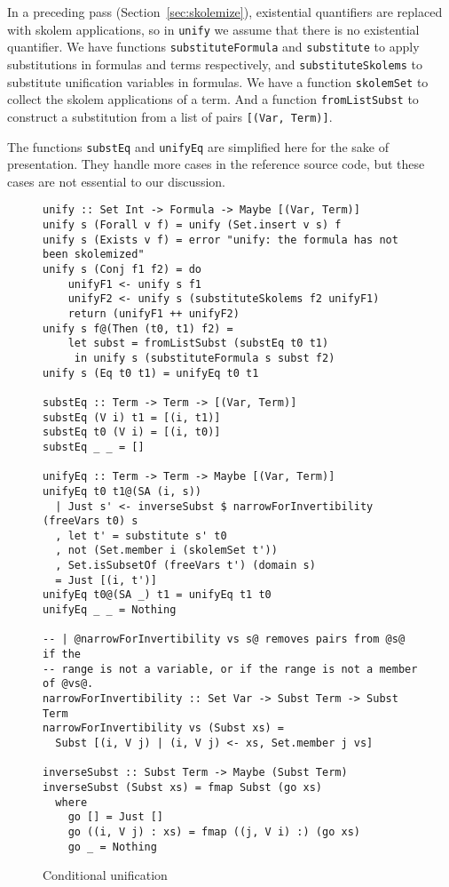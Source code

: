 \documentclass[sigconf, review]{acmart}
\newcommand{\tc}[1]{{\small\texttt{#1}}}
\begin{document}
In a preceding pass (Section~\ref{sec:skolemize}), existential quantifiers are replaced
with skolem applications, so in \tc{unify} we assume that there is no
existential quantifier. We have functions \tc{substituteFormula} and \tc{substitute}
to apply substitutions in formulas and terms respectively, and \tc{substituteSkolems} to  substitute
unification variables in formulas. We have a function \tc{skolemSet} to collect the skolem applications of a
term. And a function \tc{fromListSubst} to construct a substitution from a list of
pairs \tc{[(Var, Term)]}.

The functions \tc{substEq} and \tc{unifyEq} are simplified here for the sake of presentation.
They handle more cases in the reference source code, but these cases are not essential to our
discussion.

\begin{figure}
\begin{verbatim}
unify :: Set Int -> Formula -> Maybe [(Var, Term)]
unify s (Forall v f) = unify (Set.insert v s) f
unify s (Exists v f) = error "unify: the formula has not been skolemized"
unify s (Conj f1 f2) = do
    unifyF1 <- unify s f1
    unifyF2 <- unify s (substituteSkolems f2 unifyF1)
    return (unifyF1 ++ unifyF2)
unify s f@(Then (t0, t1) f2) =
    let subst = fromListSubst (substEq t0 t1)
     in unify s (substituteFormula s subst f2)
unify s (Eq t0 t1) = unifyEq t0 t1

substEq :: Term -> Term -> [(Var, Term)]
substEq (V i) t1 = [(i, t1)]
substEq t0 (V i) = [(i, t0)]
substEq _ _ = []

unifyEq :: Term -> Term -> Maybe [(Var, Term)]
unifyEq t0 t1@(SA (i, s))
  | Just s' <- inverseSubst $ narrowForInvertibility (freeVars t0) s
  , let t' = substitute s' t0
  , not (Set.member i (skolemSet t'))
  , Set.isSubsetOf (freeVars t') (domain s)
  = Just [(i, t')]
unifyEq t0@(SA _) t1 = unifyEq t1 t0
unifyEq _ _ = Nothing

-- | @narrowForInvertibility vs s@ removes pairs from @s@ if the
-- range is not a variable, or if the range is not a member of @vs@.
narrowForInvertibility :: Set Var -> Subst Term -> Subst Term
narrowForInvertibility vs (Subst xs) =
  Subst [(i, V j) | (i, V j) <- xs, Set.member j vs]

inverseSubst :: Subst Term -> Maybe (Subst Term)
inverseSubst (Subst xs) = fmap Subst (go xs)
  where
    go [] = Just []
    go ((i, V j) : xs) = fmap ((j, V i) :) (go xs)
    go _ = Nothing
\end{verbatim}
\caption{Conditional unification}
\label{conditional-unification}
\end{figure}
\end{document}
